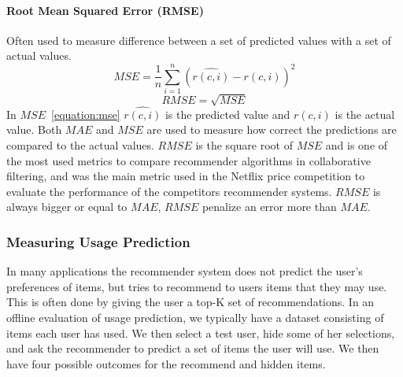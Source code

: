 \paragraph{Root Mean Squared Error (RMSE)}
Often used to measure difference between a set of predicted values with a set of actual values.
\begin{equation}
    MSE = \frac{1}{n}\sum_{i=1}^{n}{(\hat{r(c,i)} - r(c,i))^{2}}
    \label{equation:mse}
\end{equation}
\begin{equation}
    RMSE = \sqrt{MSE}
    \label{equation:rmse}
\end{equation}
In $MSE$~\ref{equation:mse} $\hat{r(c,i)}$ is the predicted value and $r(c,i)$ is the actual value.
Both $MAE$ and $MSE$ are used to measure how correct the predictions are compared to the actual values.
$RMSE$ is the square root of $MSE$ and is one of the most used metrics to compare recommender algorithms in collaborative filtering, and was the main metric used in the Netflix price competition to evaluate the performance of the competitors recommender systems.
$RMSE$ is always bigger or equal to $MAE$, $RMSE$ penalize an error more than $MAE$.




\subsubsection{Measuring Usage Prediction}
\label{para:measuring_usage}
In many applications the recommender system does not predict the user's
preferences of items, but tries to recommend to users items that they may use.
This is often done by giving the user a top-K set of recommendations.
In an offline evaluation of usage prediction, we typically have a dataset
consisting of items each user has used. We then select a test user, hide some
of her selections, and ask the recommender to predict a set of items the user
will use. We then have four possible outcomes for the recommend and hidden
items.

